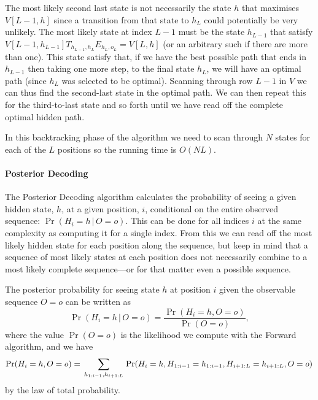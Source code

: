 The most likely second last state is not necessarily the state $h$ that maximises $V[L-1,h]$ since a transition from that state to $h_L$ could potentially be very unlikely. The most likely state at index $L-1$ must be the state $h_{L-1}$ that satisfy $V[L-1,h_{L-1}] T_{h_{L-1},h_L} E_{h_L,o_L} = V[L,h]$ (or an arbitrary such if there are more than one). This state satisfy that, if we have the best possible path that ends in $h_{L-1}$ then taking one more step, to the final state $h_L$, we will have an optimal path (since $h_L$ was selected to be optimal). Scanning through row $L-1$ in $V$ we can thus find the second-last state in the optimal path. We can then repeat this for the third-to-last state and so forth until we have read off the complete optimal hidden path.

In this backtracking phase of the algorithm we need to scan through $N$ states for each of the $L$ positions so the running time is $O(NL)$.


\paragraph{Posterior Decoding}

The Posterior Decoding algorithm calculates the probability of seeing a given hidden state, $h$, at a given position, $i$, conditional on the entire observed sequence: $\Pr(H_i=h\,|\,O=o)$. This can be done for all indices $i$ at the same complexity as computing it for a single index. From this we can read off the most likely hidden state for each position along the sequence, but keep in mind that a sequence of most likely states at each position does not necessarily combine to a most likely complete sequence---or for that matter even a possible sequence.

The posterior probability for seeing state $h$ at position $i$ given the observable sequence $O=o$ can be written as 
\begin{displaymath}
    \Pr(H_i=h\,|\,O=o) = \frac{\Pr(H_i=h,O=o)}{\Pr(O=o)},
\end{displaymath}
where the value $\Pr(O=o)$ is the likelihood we compute with the Forward algorithm, and we have
\begin{dmath*}
    \Pr(H_i=h,O=o) = \\
        \sum_{h_{1:i-1}, h_{i+1:L}} 
        \left.
            \Pr(H_i=h, H_{1:i-1}=h_{1:i-1}, H_{i+1:L}=h_{i+1:L},O=o) 
        \right.
\end{dmath*}
by the law of total probability.

